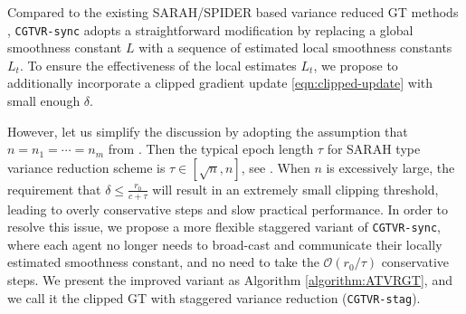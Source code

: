\documentclass{article}
\newcommand{\cO}{\mathcal{O}}
\begin{document}
Compared to the existing SARAH/SPIDER based variance reduced GT methods \cite{sun2020improving,xin2020near}, \texttt{CGTVR-sync} adopts a straightforward modification by replacing a global smoothness constant $L$ with a sequence of estimated local smoothness constants $L_t$. To ensure the effectiveness of the local estimates $L_t$, we propose to additionally incorporate a clipped gradient update \eqref{eqn:clipped-update} with small enough $\delta$. 

However, let us simplify the discussion by adopting the assumption that $n=n_1=\cdots=n_m$ from \cite{sun2020improving,xin2020near}. Then the typical epoch length $\tau$ for SARAH type variance reduction scheme is $\tau\in[\sqrt{n},n]$, see \cite{pham2020proxsarah}. When $n$ is excessively large, the requirement that $\delta\leq\frac{r_0}{c+\tau}$ will result in an extremely small clipping threshold, leading to overly conservative steps and slow practical performance. In order to resolve this issue, we propose a more flexible staggered variant of \texttt{CGTVR-sync}, where each agent no longer needs to broad-cast and communicate their locally estimated smoothness constant, and no need to take the $\cO(r_0/\tau)$ conservative steps. We present the improved variant as Algorithm \ref{algorithm:ATVRGT}, and we call it the clipped GT with staggered variance reduction (\texttt{CGTVR-stag}). 
\end{document}
